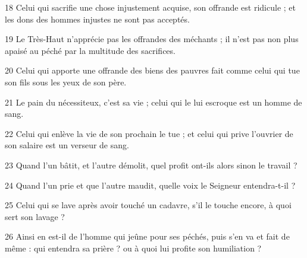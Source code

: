 \par 18 Celui qui sacrifie une chose injustement acquise, son offrande est ridicule ; et les dons des hommes injustes ne sont pas acceptés.
\par 19 Le Très-Haut n'apprécie pas les offrandes des méchants ; il n'est pas non plus apaisé au péché par la multitude des sacrifices.
\par 20 Celui qui apporte une offrande des biens des pauvres fait comme celui qui tue son fils sous les yeux de son père.
\par 21 Le pain du nécessiteux, c'est sa vie ; celui qui le lui escroque est un homme de sang.
\par 22 Celui qui enlève la vie de son prochain le tue ; et celui qui prive l'ouvrier de son salaire est un verseur de sang.
\par 23 Quand l'un bâtit, et l'autre démolit, quel profit ont-ils alors sinon le travail ?
\par 24 Quand l'un prie et que l'autre maudit, quelle voix le Seigneur entendra-t-il ?
\par 25 Celui qui se lave après avoir touché un cadavre, s'il le touche encore, à quoi sert son lavage ?
\par 26 Ainsi en est-il de l'homme qui jeûne pour ses péchés, puis s'en va et fait de même : qui entendra sa prière ? ou à quoi lui profite son humiliation ?


